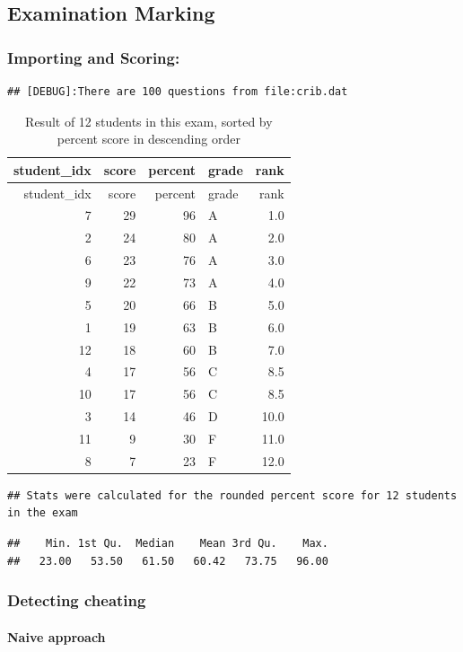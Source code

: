 \documentclass[a4paperpaper,]{article}
\let\oldparagraph\paragraph
\renewcommand{\paragraph}[1]{\oldparagraph{#1}\mbox{}}
\begin{document}
\subsection{Examination Marking}\label{examination-marking}

\subsubsection{Importing and Scoring:}\label{importing-and-scoring}

\begin{verbatim}
## [DEBUG]:There are 100 questions from file:crib.dat
\end{verbatim}

\begin{longtable}[]{@{}rrrlr@{}}
\caption{Result of 12 students in this exam, sorted by percent score in
descending order}\tabularnewline
\toprule
student\_idx & score & percent & grade & rank\tabularnewline
\midrule
\endfirsthead
\toprule
student\_idx & score & percent & grade & rank\tabularnewline
\midrule
\endhead
7 & 29 & 96 & A & 1.0\tabularnewline
2 & 24 & 80 & A & 2.0\tabularnewline
6 & 23 & 76 & A & 3.0\tabularnewline
9 & 22 & 73 & A & 4.0\tabularnewline
5 & 20 & 66 & B & 5.0\tabularnewline
1 & 19 & 63 & B & 6.0\tabularnewline
12 & 18 & 60 & B & 7.0\tabularnewline
4 & 17 & 56 & C & 8.5\tabularnewline
10 & 17 & 56 & C & 8.5\tabularnewline
3 & 14 & 46 & D & 10.0\tabularnewline
11 & 9 & 30 & F & 11.0\tabularnewline
8 & 7 & 23 & F & 12.0\tabularnewline
\bottomrule
\end{longtable}

\begin{verbatim}
## Stats were calculated for the rounded percent score for 12 students in the exam
\end{verbatim}

\begin{verbatim}
##    Min. 1st Qu.  Median    Mean 3rd Qu.    Max. 
##   23.00   53.50   61.50   60.42   73.75   96.00
\end{verbatim}

\subsubsection{Detecting cheating}\label{detecting-cheating}

\paragraph{Naive approach}\label{naive-approach}
\end{document}

